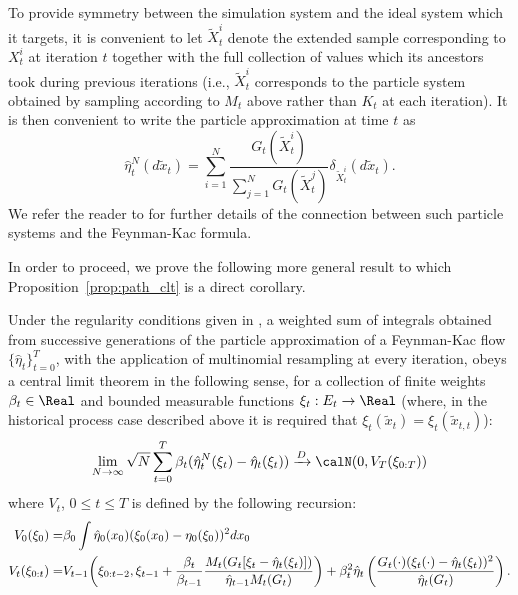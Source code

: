 To provide symmetry between the simulation system and the ideal system which
it targets, it is convenient to let $\tilde{X}_t^i$ denote the extended
sample corresponding to $X_t^i$ at iteration $t$ together with the full
collection of values which its ancestors took during previous iterations
(i.e., $\tilde{X}_t^i$ corresponds to the particle system obtained by
sampling according to $M_t$ above rather than $K_t$ at each iteration).  It is
then convenient to write the particle approximation at time $t$ as
$$\hat\eta_t^N(d\tilde{x}_t) = \sum_{i=1}^N
\frac{G_t(\tilde{X}_t^i)}{\sum_{j=1}^N G_t(\tilde{X}_t^j)}
\delta_{\tilde{X}_t^i}(d\tilde{x}_t).$$ We refer the reader to
\cite{DelMoral:2004ux} for further details of the connection between such
particle systems and the Feynman-Kac formula.

In order to proceed, we prove the following more general result to which
Proposition~\ref{prop:path_clt} is a direct corollary.

\begin{proposition}\label{prop:gen_clt}
  Under the regularity conditions given in \cite[section 9.4, pp.
  300--306]{DelMoral:2004ux}, a weighted sum of integrals obtained from
  successive generations of the particle approximation of a Feynman-Kac flow
  $\{\hat\eta_t\}_{t=0}^T$, with the application of multinomial resampling
  at every iteration, obeys a central limit theorem in the following sense,
  for a collection of finite weights $\beta_t\in\Real$ and bounded measurable
  functions $\xi_t:E_t \to\Real$ (where, in the historical process case
  described above it is required that $\xi_t(\tilde{x}_t) =
  \xi_t(\tilde{x}_{t,t})$):
  \begin{equation}
    \lim_{N\to\infty}\sqrt{N}
    \sum_{t=0}^T\beta_t(\hat\eta_t^N(\xi_t)-\hat\eta_t(\xi_t))
    \xrightarrow{D}\calN(0,V_T(\xi_{0:T}))
  \end{equation}
  where $V_t$, $0\le t \le T$ is defined by the following recursion:
  \begin{align}
    V_0(\xi_0) =& \beta_0 \int \hat\eta_0(x_0)(\xi_0(x_0) -
    \eta_0(\xi_0))^2 dx_0\notag\\
    V_t(\xi_{0:t}) =& V_{t-1}\biggl(\xi_{0:t-2}, \xi_{t-1}
    + \frac{\beta_t}{\beta_{t-1}}
    \frac{M_t(G_t[\xi_t-\hat\eta_t(\xi_t)])}{\hat\eta_{t-1}M_t(G_t)}\biggr)
    + \beta_t^2\hat\eta_t\left(\frac{G_t(\cdot) (\xi_t(\cdot)-\hat\eta_t(\xi_t))^2}{\hat\eta_t(G_t)}\right).
  \end{align}
\end{proposition}

